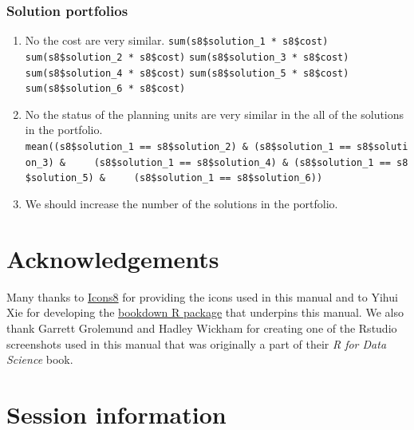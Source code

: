\documentclass[
  12pt,
]{book}
\makeatletter
\providecommand{\tightlist}{%
  \setlength{\itemsep}{0pt}\setlength{\parskip}{0pt}}
\newenvironment{kframe}{%
\medskip{}
\setlength{\fboxsep}{.8em}
 \def\at@end@of@kframe{}%
 \ifinner\ifhmode%
  \def\at@end@of@kframe{\end{minipage}}%
  \begin{minipage}{\columnwidth}%
 \fi\fi%
 \def\FrameCommand##1{\hskip\@totalleftmargin \hskip-\fboxsep
 \colorbox{shadecolor}{##1}\hskip-\fboxsep
     \hskip-\linewidth \hskip-\@totalleftmargin \hskip\columnwidth}%
 \MakeFramed {\advance\hsize-\width
   \@totalleftmargin\z@ \linewidth\hsize
   \@setminipage}}%
 {\par\unskip\endMakeFramed%
 \at@end@of@kframe}
\newenvironment{rmdblock}[1]
  {
  \begin{itemize}
  \renewcommand{\labelitemi}{
    \raisebox{-.7\height}[0pt][0pt]{
      {\setkeys{Gin}{width=3em,keepaspectratio}\texttt{[image: images/\#1]}}
    }
  }
  \setlength{\fboxsep}{1em}
  \begin{kframe}
  \item
  }
  {
  \end{kframe}
  \end{itemize}
  }
\newenvironment{rmdanswer}
  {\begin{rmdblock}{answer}}
  {\end{rmdblock}}
\makeatother
\begin{document}
\clearpage

\hypertarget{solution-portfolios-1}{%
\subsection{Solution portfolios}\label{solution-portfolios-1}}

\begin{rmdanswer}
\begin{enumerate}
\def\labelenumi{\arabic{enumi}.}
\tightlist
\item
  No the cost are very similar. \newline
  \texttt{sum(s8\$solution\_1\ *\ s8\$cost)} \newline
  \texttt{sum(s8\$solution\_2\ *\ s8\$cost)} \newline
  \texttt{sum(s8\$solution\_3\ *\ s8\$cost)} \newline
  \texttt{sum(s8\$solution\_4\ *\ s8\$cost)} \newline
  \texttt{sum(s8\$solution\_5\ *\ s8\$cost)} \newline
  \texttt{sum(s8\$solution\_6\ *\ s8\$cost)}
\item
  No the status of the planning units are very similar in the all of the solutions in the portfolio. \newline
  \texttt{mean((s8\$solution\_1\ ==\ s8\$solution\_2)\ \&\ (s8\$solution\_1\ ==\ s8\$solution\_3)\ \&\ \ \ \ \ (s8\$solution\_1\ ==\ s8\$solution\_4)\ \&\ (s8\$solution\_1\ ==\ s8\$solution\_5)\ \&\ \ \ \ \ (s8\$solution\_1\ ==\ s8\$solution\_6))}
\item
  We should increase the number of the solutions in the portfolio.
\end{enumerate}
\end{rmdanswer}

\hypertarget{acknowledgements}{%
\chapter{Acknowledgements}\label{acknowledgements}}

Many thanks to \href{https://icons8.com}{Icons8} for providing the icons used in this manual and to Yihui Xie for developing the \href{http://bookdown.org}{bookdown R package} that underpins this manual. We also thank Garrett Grolemund and Hadley Wickham for creating one of the Rstudio screenshots used in this manual that was originally a part of their \emph{R for Data Science} book.

\hypertarget{session-information}{%
\chapter{Session information}\label{session-information}}
\end{document}
